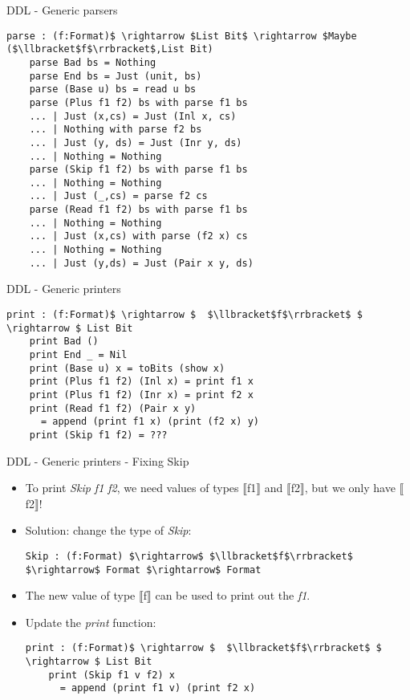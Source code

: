 \documentclass[10pt]{beamer}
\begin{document}
\begin{frame}[fragile]{DDL - Generic parsers}
	\begin{lstlisting}[mathescape=true]
	parse : (f:Format)$ \rightarrow $List Bit$ \rightarrow $Maybe ($\llbracket$f$\rrbracket$,List Bit)
	parse Bad bs = Nothing
	parse End bs = Just (unit, bs)
	parse (Base u) bs = read u bs
	parse (Plus f1 f2) bs with parse f1 bs
	... | Just (x,cs) = Just (Inl x, cs)
	... | Nothing with parse f2 bs
	... | Just (y, ds) = Just (Inr y, ds)
	... | Nothing = Nothing 
	parse (Skip f1 f2) bs with parse f1 bs
	... | Nothing = Nothing
	... | Just (_,cs) = parse f2 cs
	parse (Read f1 f2) bs with parse f1 bs
	... | Nothing = Nothing
	... | Just (x,cs) with parse (f2 x) cs
	... | Nothing = Nothing
	... | Just (y,ds) = Just (Pair x y, ds) 
	\end{lstlisting}
\end{frame}

\begin{frame}[fragile]{DDL - Generic printers}
	\begin{lstlisting}[mathescape=true]
	print : (f:Format)$ \rightarrow $  $\llbracket$f$\rrbracket$ $ \rightarrow $ List Bit
	print Bad ()
	print End _ = Nil
	print (Base u) x = toBits (show x)
	print (Plus f1 f2) (Inl x) = print f1 x
	print (Plus f1 f2) (Inr x) = print f2 x
	print (Read f1 f2) (Pair x y) 
	  = append (print f1 x) (print (f2 x) y)
	print (Skip f1 f2) = ???
	\end{lstlisting}
\end{frame}

\begin{frame}[fragile]{DDL - Generic printers - Fixing Skip}

\begin{itemize}
\item To print \textit{Skip f1 f2}, we need values of types $\llbracket$f1$\rrbracket$ and $\llbracket$f2$\rrbracket$, but we only have $\llbracket$f2$\rrbracket$!
\item Solution: change the type of \textit{Skip}: 
\begin{lstlisting}[mathescape=true]
	Skip : (f:Format) $\rightarrow$ $\llbracket$f$\rrbracket$ $\rightarrow$ Format $\rightarrow$ Format
\end{lstlisting}
\item The new value of type $\llbracket$f$\rrbracket$ can be used to print out the \textit{f1}.
\item Update the \textit{print} function:
	\begin{lstlisting}[mathescape=true]
	print : (f:Format)$ \rightarrow $  $\llbracket$f$\rrbracket$ $ \rightarrow $ List Bit
	print (Skip f1 v f2) x 
	  = append (print f1 v) (print f2 x)
	\end{lstlisting}
\end{itemize}

\end{frame}
\end{document}
